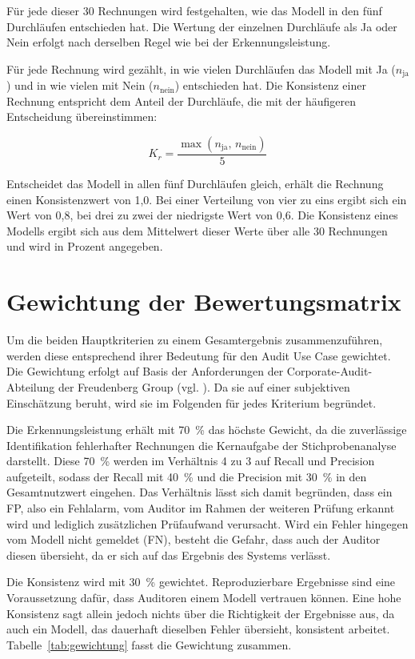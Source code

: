 Für jede dieser 30 Rechnungen wird festgehalten, wie das Modell in den fünf Durchläufen entschieden hat. Die Wertung der einzelnen Durchläufe als Ja oder Nein erfolgt nach derselben Regel wie bei der Erkennungsleistung.

Für jede Rechnung wird gezählt, in wie vielen Durchläufen das Modell mit Ja ($n_{\text{ja}}$) und in wie vielen mit Nein ($n_{\text{nein}}$) entschieden hat. Die Konsistenz einer Rechnung entspricht dem Anteil der Durchläufe, die mit der häufigeren Entscheidung übereinstimmen:

\begin{equation}
K_r = \frac{\max(n_{\text{ja}},\, n_{\text{nein}})}{5}
\end{equation}

Entscheidet das Modell in allen fünf Durchläufen gleich, erhält die Rechnung einen Konsistenzwert von 1,0. Bei einer Verteilung von vier zu eins ergibt sich ein Wert von 0,8, bei drei zu zwei der niedrigste Wert von 0,6. Die Konsistenz eines Modells ergibt sich aus dem Mittelwert dieser Werte über alle 30 Rechnungen und wird in Prozent angegeben.

\section{Gewichtung der Bewertungsmatrix}
\label{sec:gewichtung}

Um die beiden Hauptkriterien zu einem Gesamtergebnis zusammenzuführen, werden diese entsprechend ihrer Bedeutung für den Audit Use Case gewichtet. Die Gewichtung erfolgt auf Basis der Anforderungen der Corporate-Audit-Abteilung der Freudenberg Group (vgl. \cite{Goth2026}). Da sie auf einer subjektiven Einschätzung beruht, wird sie im Folgenden für jedes Kriterium begründet.

Die Erkennungsleistung erhält mit 70~\% das höchste Gewicht, da die zuverlässige Identifikation fehlerhafter Rechnungen die Kernaufgabe der Stichprobenanalyse darstellt. Diese 70~\% werden im Verhältnis 4 zu 3 auf Recall und Precision aufgeteilt, sodass der Recall mit 40~\% und die Precision mit 30~\% in den Gesamtnutzwert eingehen. Das Verhältnis lässt sich damit begründen, dass ein \ac{FP}, also ein Fehlalarm, vom Auditor im Rahmen der weiteren Prüfung erkannt wird und lediglich zusätzlichen Prüfaufwand verursacht. Wird ein Fehler hingegen vom Modell nicht gemeldet (\ac{FN}), besteht die Gefahr, dass auch der Auditor diesen übersieht, da er sich auf das Ergebnis des Systems verlässt.

Die Konsistenz wird mit 30~\% gewichtet. Reproduzierbare Ergebnisse sind eine Voraussetzung dafür, dass Auditoren einem Modell vertrauen können. Eine hohe Konsistenz sagt allein jedoch nichts über die Richtigkeit der Ergebnisse aus, da auch ein Modell, das dauerhaft dieselben Fehler übersieht, konsistent arbeitet. Tabelle~\ref{tab:gewichtung} fasst die Gewichtung zusammen.

